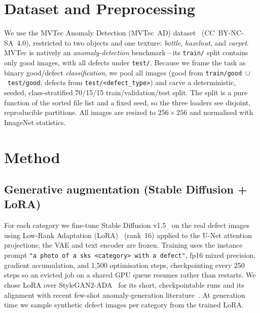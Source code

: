 \documentclass[11pt]{article}
\begin{document}
\section{Dataset and Preprocessing}
We use the MVTec Anomaly Detection (MVTec~AD) dataset~\cite{bergmann2019mvtec}
(CC~BY-NC-SA~4.0), restricted to two objects and one texture:
\textit{bottle}, \textit{hazelnut}, and \textit{carpet}. MVTec is natively an
\emph{anomaly-detection} benchmark---its \texttt{train/} split contains only
good images, with all defects under \texttt{test/}. Because we frame the task as
binary good/defect \emph{classification}, we pool all images (good from
\texttt{train/good}~$\cup$~\texttt{test/good}; defects from
\texttt{test/<defect\_type>}) and carve a deterministic, seeded, class-stratified
70/15/15 train/validation/test split. The split is a pure function of the sorted
file list and a fixed seed, so the three loaders see disjoint, reproducible
partitions. All images are resized to $256\times256$ and normalised with
ImageNet statistics.

\section{Method}

\subsection{Generative augmentation (Stable Diffusion + LoRA)}
For each category we fine-tune Stable Diffusion v1.5~\cite{rombach2022ldm} on the
real defect images using Low-Rank Adaptation (LoRA)~\cite{hu2021lora}
(rank~16) applied to the U-Net attention projections; the VAE and text encoder
are frozen. Training uses the instance prompt \texttt{"a photo of a sks
<category> with a defect"}, fp16 mixed precision, gradient accumulation, and
1{,}500 optimisation steps, checkpointing every 250 steps so an evicted job on a
shared GPU queue resumes rather than restarts. We chose LoRA over
StyleGAN2-ADA~\cite{karras2020stylegan2ada} for its short, checkpointable runs
and its alignment with recent few-shot anomaly-generation
literature~\cite{anomalydiffusion2024}. At generation time we sample synthetic
defect images per category from the trained LoRA.
\end{document}
